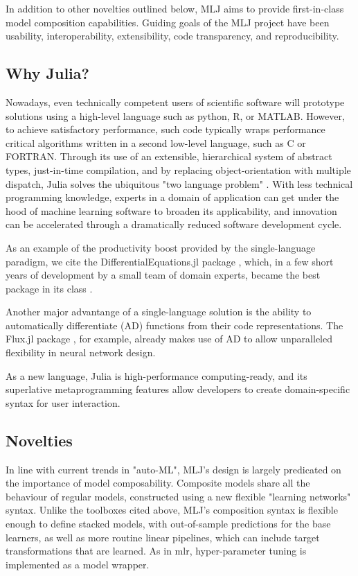 \documentclass{article}
\begin{document}
In addition to other novelties outlined below, MLJ aims to provide first-in-class model composition capabilities. Guiding goals of the MLJ project have been usability, interoperability, extensibility, code transparency, and reproducibility.

\subsection{Why Julia?}

Nowadays, even technically competent users of scientific software will prototype solutions using a high-level language such as python, R, or MATLAB. However, to achieve satisfactory performance, such code typically wraps performance critical algorithms written in a second low-level language, such as C or FORTRAN. Through its use of an extensible, hierarchical system of abstract types, just-in-time compilation, and by replacing object-orientation with multiple dispatch, Julia solves the ubiquitous "two language problem" \cite{BezansonEtal2017}. With less technical programming knowledge, experts in a domain of application can get under the hood of machine learning software to broaden its applicability, and innovation can be accelerated through a dramatically reduced software development cycle.

As an example of the productivity boost provided by the single-language paradigm, we cite the DifferentialEquations.jl package \cite{RackauckasNie2017}, which, in a few short years of development by a small team of domain experts, became the best package in its class \cite{Rackauckas2017}.

Another major advantange of a single-language solution is the ability to automatically differentiate (AD) functions from their code representations. The Flux.jl package \cite{Innes2018}, for example, already makes use of AD to allow unparalleled flexibility in neural network design.

As a new language, Julia is high-performance computing-ready, and its superlative metaprogramming features allow developers to create domain-specific syntax for user interaction.

\subsection{Novelties}

In line with current trends in "auto-ML", MLJ's design is largely predicated on the importance of model composability. Composite models share all the behaviour of regular models, constructed using a new flexible "learning networks" syntax. Unlike the toolboxes cited above, MLJ's composition syntax is flexible enough to define stacked models, with out-of-sample predictions for the base learners, as well as more routine linear pipelines, which can include target transformations that are learned. As in mlr, hyper-parameter tuning is implemented as a model wrapper.
\end{document}
